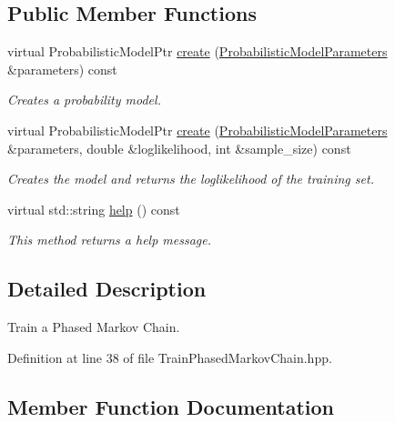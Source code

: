 \subsection*{Public Member Functions}
\begin{DoxyCompactItemize}
\item 
virtual Probabilistic\+Model\+Ptr \hyperlink{classtops_1_1TrainPhasedMarkovChain_a31219afb1abf369674c2862a5017a112}{create} (\hyperlink{classtops_1_1ProbabilisticModelParameters}{Probabilistic\+Model\+Parameters} \&parameters) const
\begin{DoxyCompactList}\small\item\em Creates a probability model. \end{DoxyCompactList}\item 
\mbox{\label{classtops_1_1TrainPhasedMarkovChain_a2753aba53966bb707f46e07ad42c4565}} 
virtual Probabilistic\+Model\+Ptr \hyperlink{classtops_1_1TrainPhasedMarkovChain_a2753aba53966bb707f46e07ad42c4565}{create} (\hyperlink{classtops_1_1ProbabilisticModelParameters}{Probabilistic\+Model\+Parameters} \&parameters, double \&loglikelihood, int \&sample\+\_\+size) const
\begin{DoxyCompactList}\small\item\em Creates the model and returns the loglikelihood of the training set. \end{DoxyCompactList}\item 
\mbox{\label{classtops_1_1TrainPhasedMarkovChain_a4d70ec3fcedf590d46140336b5a7d9e8}} 
virtual std\+::string \hyperlink{classtops_1_1TrainPhasedMarkovChain_a4d70ec3fcedf590d46140336b5a7d9e8}{help} () const
\begin{DoxyCompactList}\small\item\em This method returns a help message. \end{DoxyCompactList}\end{DoxyCompactItemize}


\subsection{Detailed Description}
Train a Phased Markov Chain. 

Definition at line 38 of file Train\+Phased\+Markov\+Chain.\+hpp.



\subsection{Member Function Documentation}
\mbox{\label{classtops_1_1TrainPhasedMarkovChain_a31219afb1abf369674c2862a5017a112}} 
